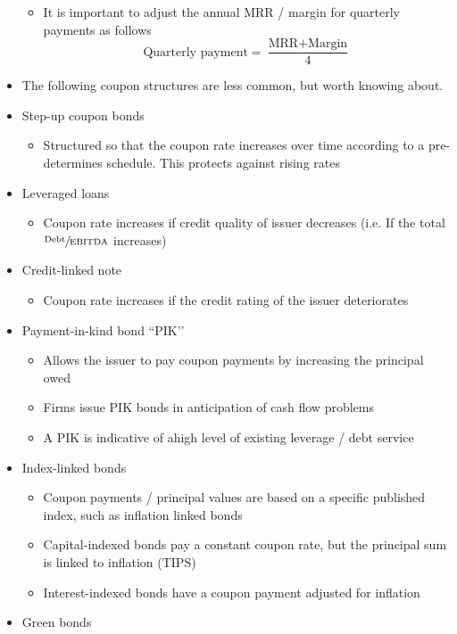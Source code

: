 \documentclass[../notes_compiled.tex]{subfiles}
\begin{document}
\begin{itemize}
\begin{itemize}
\item It is important to adjust the annual MRR / margin for quarterly payments as follows
\begin{equation}
\text{Quarterly payment} = \frac{\text{MRR} + \text{Margin}}{4}
\end{equation}
\end{itemize}
\item[] The following coupon structures are less common, but worth knowing about.
\item Step-up coupon bonds
\begin{itemize}
\item Structured so that the coupon rate increases over time according to a pre-determines schedule. This protects against rising rates
\end{itemize}
\item Leveraged loans
\begin{itemize}
\item Coupon rate increases if credit quality of issuer decreases (i.e. If the total $\sfrac{\text{Debt}}{\text{EBITDA}}$ increases)
\end{itemize}
\item Credit-linked note
\begin{itemize}
\item Coupon rate increases if the credit rating of the issuer deteriorates
\end{itemize}
\item Payment-in-kind bond ``PIK’’
\begin{itemize}
\item Allows the issuer to pay coupon payments by increasing the principal owed
\item Firms issue PIK bonds in anticipation of cash flow problems
\item A PIK is indicative of ahigh level of existing leverage / debt service
\end{itemize}
\item Index-linked bonds
\begin{itemize}
\item Coupon payments / principal values are based on a specific published index, such as inflation linked bonds
\item Capital-indexed bonds pay a constant coupon rate, but the principal sum is linked to inflation (TIPS)
\item Interest-indexed bonds have a coupon payment adjusted for inflation
\end{itemize}
\item Green bonds

\end{itemize}
\end{document}
